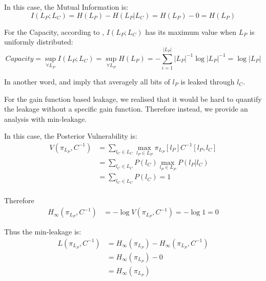 In this case, the Mutual Information is:
\begin{equation} \label{Eq: MI in length}
	I(L_{P};L_{C}) = H(L_{P}) - H(L_{P} | L_{C} ) = H(L_{P}) - 0 = H(L_{P})
\end{equation}

For the Capacity, according to , $I(L_{P};L_{C})$ has its maximum value when $L_{P}$ is uniformly distributed:
\begin{equation} \label{Eq: Cap in length}
	Capacity = \sup_{\forall L_{P}}{I(L_{P};L_{C})} = \sup_{\forall L_{P}}H(L_{P}) = - \sum_{i = 1}^{|L_{P}|}|L_{P}|^{-1}\log{|L_{P}|^{-1}} = \log{|L_{P}|}
\end{equation}

In another word,  and   imply that averagely all bits of $l_{P}$ is leaked through $l_{C}$.

For the gain function based leakage\cite{GLeakage}, we realised that it would be hard to quantify the leakage without a specific gain function. Therefore instead, we provide an analysis with min-leakage.

In this case, the Posterior Vulnerability is:
\begin{equation}
	\begin{aligned}
		V(\pi_{L_P}, C^{-1}) 
		&= \sum_{l_{C} \in L_{C}} \max_{l_{P} \in L_{P}} \pi_{L_P}[l_P]C^{-1}[l_P,l_C] \\
		&=  \sum_{l_{C} \in L_{C}} P(l_C) \max_{l_{P} \in L_{P}} P(l_P | l_C) \\
	      &= \sum_{l_{C} \in L_{C}} P(l_C) = 1 \\
	\end{aligned}
\end{equation}

Therefore
\begin{equation}
	\begin{aligned}
		H_{\infty}(\pi_{L_{P}}, C^{-1})
		 &= - \log{V(\pi_{L_{P}}, C^{-1})} = - \log1= 0
	\end{aligned}
\end{equation}

Thus the min-leakage is:
\begin{equation}
	\begin{aligned}
	L(\pi_{L_P}, C^{-1}) 
	 &= H_{\infty}(\pi_{L_P}) - H_{\infty}(\pi_{L_{P}}, C^{-1}) \\
	 &= H_{\infty}(\pi_{L_P}) - 0 \\
	 &= H_{\infty}(\pi_{L_P})
	\end{aligned}
\end{equation}

